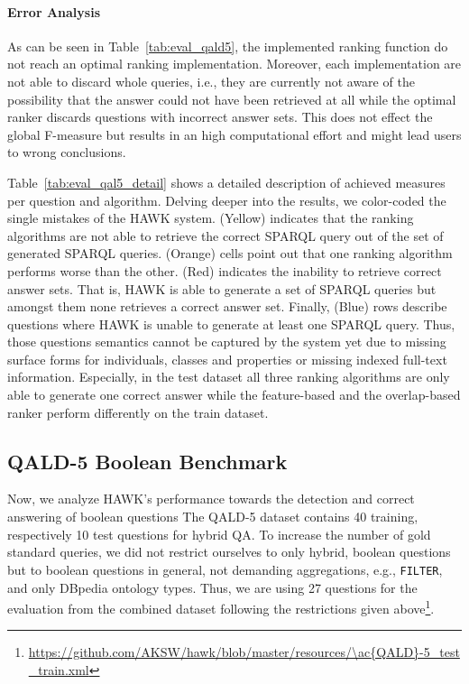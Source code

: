 \paragraph{Error Analysis}
As can be seen in Table~\ref{tab:eval_qald5}, the implemented ranking function do not reach an optimal ranking implementation.
Moreover, each implementation are not able to discard whole queries, i.e., they are currently not aware of the possibility that the answer could not have been retrieved at all while the optimal ranker discards questions with incorrect answer sets. 
This does not effect the global F-measure but results in an high computational effort and might lead users to wrong conclusions. 

Table~\ref{tab:eval_qal5_detail} shows a detailed description of achieved measures per question and algorithm. 
Delving deeper into the results, we color-coded the single mistakes of the HAWK system.
(Yellow) indicates that the ranking algorithms are not able to retrieve the correct SPARQL query out of the set of generated SPARQL queries. 
(Orange) cells point out that one ranking algorithm performs worse than the other. 
(Red) indicates the inability to retrieve correct answer sets.
That is, HAWK is able to generate a set of SPARQL queries but amongst them none retrieves a correct answer set.
Finally, (Blue) rows describe questions where HAWK is unable to generate at least one SPARQL query.
Thus, those questions semantics cannot be captured by the system yet due to missing surface forms for individuals, classes and properties or missing indexed full-text information.
Especially, in the test dataset all three ranking algorithms are only able to generate one correct answer while the feature-based and the overlap-based ranker perform differently on the train dataset.





\subsection{QALD-5 Boolean Benchmark}

Now, we analyze HAWK's performance towards the detection and correct answering of boolean questions
The \ac{QALD}-5 dataset contains 40 training, respectively 10 test questions for hybrid \ac{QA}.
To increase the number of gold standard queries, we did not restrict ourselves to only hybrid, boolean questions but to boolean questions in general, not demanding aggregations, e.g., \texttt{FILTER}, and only DBpedia ontology types.
Thus, we are using 27 questions for the evaluation from the combined dataset following the restrictions given above\footnote{\url{https://github.com/AKSW/hawk/blob/master/resources/\ac{QALD}-5_test_train.xml}}.


